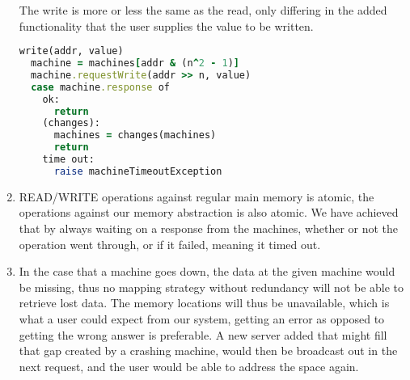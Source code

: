 \documentclass[a4paper]{article}
\begin{document}
\begin{enumerate}
\begin{lstlisting}[language=Ruby, caption={READ}]
    \end{lstlisting}
    The write is more or less the same as the read, only differing in the added functionality that the user supplies the value to be written.
    \begin{lstlisting}[language=Ruby, caption={WRITE}]
write(addr, value)
  machine = machines[addr & (n^2 - 1)]
  machine.requestWrite(addr >> n, value)
  case machine.response of
    ok:
      return
    (changes):
      machines = changes(machines)
      return
    time out:
      raise machineTimeoutException
    \end{lstlisting}
  \item
    READ/WRITE operations against regular main memory is atomic, the operations against our memory abstraction is also atomic. We have achieved that by always waiting on a response from the machines, whether or not the operation went through, or if it failed, meaning it timed out.
  \item
    In the case that a machine goes down, the data at the given machine would be missing, thus no mapping strategy without redundancy will not be able to retrieve lost data. The memory locations will thus be unavailable, which is what a user could expect from our system, getting an error as opposed to getting the wrong answer is preferable. A new server added that might fill that gap created by a crashing machine, would then be broadcast out in the next request, and the user would be able to address the space again.
\end{enumerate}
\end{document}
